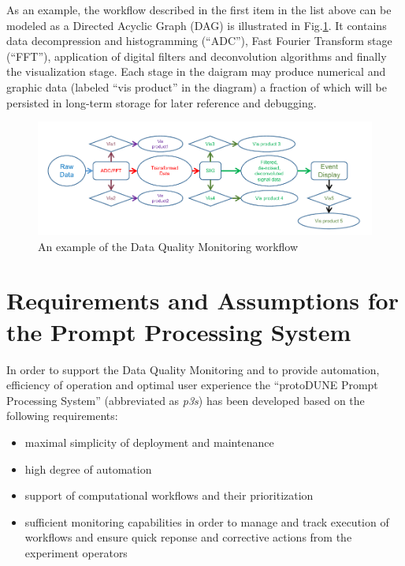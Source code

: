 \documentclass{PoS}
\newcommand{\pd}{protoDUNE\xspace}
\begin{document}
\noindent As an example, the workflow described in the first item in the list above can be modeled as a Directed Acyclic Graph (DAG)
is illustrated in Fig.\ref{fig:dag1}. It contains data decompression and histogramming (``ADC''), Fast Fourier Transform stage (``FFT''),
application of digital filters and deconvolution algorithms and finally the visualization stage. Each stage in the daigram may produce
numerical and graphic data (labeled ``vis product'' in the diagram) a fraction of which will be persisted in long-term storage for
later reference and debugging.

\begin{figure}[tb]
\centering\includegraphics[width=1.0\textwidth]{dag1.pdf}
\caption{\label{fig:dag1}An example of the Data Quality Monitoring workflow}
\end{figure}

\section{Requirements and Assumptions for the Prompt Processing System}
In order to support the Data Quality Monitoring and 
to provide automation, efficiency of operation and optimal user experience
the ``\pd Prompt Processing System'' (abbreviated as \textit{p3s}) has been developed
based on the following requirements:
\begin{itemize}
\item maximal simplicity of deployment and maintenance

\item high degree of automation

\item support of computational workflows and their prioritization

\item sufficient monitoring capabilities in order to manage and track execution of workflows and ensure quick
reponse and corrective actions from the experiment operators
\end{itemize}
\end{document}
